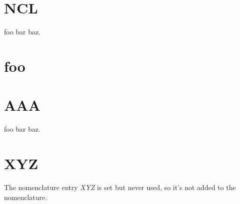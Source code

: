 \documentclass[12pt,oneside]{scrartcl}
\begin{document}
\printnomenclature
\newpage



%

\section{NCL}



foo bar  baz.

%

\section{foo}



%

\section{AAA}




foo bar  baz.

%

\section{XYZ}

The nomenclature entry \emph{XYZ} is set but never used, so it's not added to the nomenclature.
\end{document}
